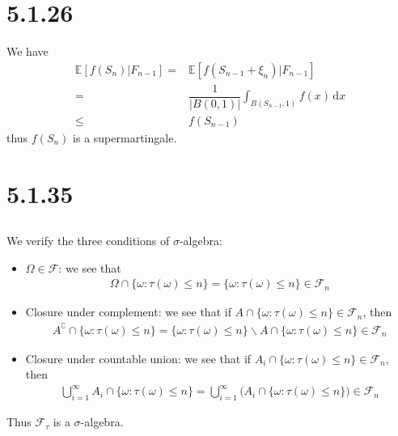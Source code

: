 \documentclass[11pt,a4paper]{ctexart}
\numberwithin{equation}{section}%
\newcommand{\F}{\mathcal{F}}
\begin{document}
\section{5.1.26}

We have
\begin{align*}
    \mathbb{E}\left[ f(S_n)|F_{n-1} \right] =& \mathbb{E}\left[ f(S_{n-1}+\xi _n)|F_{n-1} \right] \\
    =& \dfrac{ 1 }{ \left\vert B(0,1) \right\vert  } \int_{B(S_{n-1},1)} f(x)\,\mathrm{d}x \\   
    \leq& f(S_{n-1})
\end{align*}
thus $ f(S_n) $ is a supermartingale.


\section{5.1.35}

\subsection{}

We verify the three conditions of $ \sigma  $-algebra:
\begin{itemize}[topsep=2pt,itemsep=0pt]
    \item $ \Omega \in \F $: we see that
    \begin{align*}
        \Omega \cap \{\omega : \tau(\omega )\leq n\} = \{\omega : \tau(\omega )\leq n\} \in \F_n
    \end{align*}
    \item Closure under complement: we see that if $ A \cap \{\omega : \tau(\omega )\leq n\} \in \F_n $, then
    \begin{align*}
        A^\complement \cap \{\omega : \tau(\omega )\leq n\} = \{\omega : \tau(\omega )\leq n\}\backslash A \cap \{\omega : \tau(\omega )\leq n\} \in \F_{n}
    \end{align*}
    \item Closure under countable union: we see that if $ A_i \cap \{\omega : \tau(\omega )\leq n\} \in \F_n $, then
    \begin{align*}
        \bigcup_{i=1}^\infty A_i \cap \{\omega : \tau(\omega )\leq n\} = \bigcup_{i=1}^\infty \big( A_i \cap \{\omega : \tau(\omega )\leq n\} \big) \in \F_n
    \end{align*}
\end{itemize}

Thus $ \F_\tau $ is a $ \sigma  $-algebra.
\end{document}
